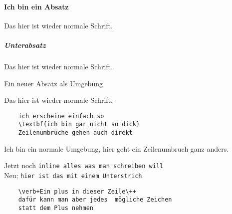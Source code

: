 \documentclass[12pt,oneside,paper=a4,ngerman]{scrartcl}
\begin{document}
    \paragraph{Ich bin ein Absatz \blindtext}
        Das hier ist wieder normale Schrift.
    \subparagraph{Unterabsatz \blindtext}
        Das hier ist wieder normale Schrift.
    
    \begin{paragraph}
        Ein neuer Absatz als Umgebung \blindtext
    \end{paragraph}

    Das hier ist wieder normale Schrift.
    
    \begin{verbatim}
    ich erscheine einfach so
    \textbf{ich bin gar nicht so dick}
    Zeilenumbrüche gehen auch direkt
    \end{verbatim}
    
    Ich bin ein normale Umgebung, hier geht
    ein Zeilenumbruch ganz anders.
    
    Jetzt noch \verb+inline alles was man schreiben will+ \\
    Neu; \verb_hier ist das mit einem Unterstrich_ \\
    
    \begin{verbatim}
    \verb+Ein plus in dieser Zeile\++
    dafür kann man aber jedes  mögliche Zeichen
    statt dem Plus nehmen
    \end{verbatim}

\end{document}
